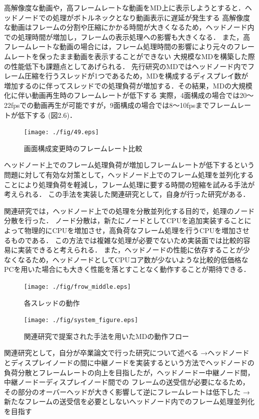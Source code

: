 高解像度な動画や，高フレームレートな動画をMD上に表示しようとすると．ヘッドノードでの処理がボトルネックとなり動画表示に遅延が発生する
高解像度な動画はフレームの分割や圧縮にかかる時間が大きくなるため，ヘッドノード内での処理時間が増加し，フレームの表示処理への影響も大きくなる．
また，高フレームレートな動画の場合には，フレーム処理時間の影響により元々のフレームレートを保ったまま動画を表示することができない
大規模なMDを構築した際の性能低下も課題点としてあげられる．
先行研究のMDではヘッドノード内でフレーム圧縮を行うスレッドが1つであるため，MDを構成するディスプレイ数が増加するのに伴ってスレッドでの処理負荷が増加する．その結果，MDの大規模化に伴い動画再生時のフレームレートが低下する
実際，4面構成の場合では20〜22fpsでの動画再生が可能ですが，9面構成の場合では8〜10fpsまでフレームレートが低下する (図2.6)．

\begin{figure}[H]
  \hspace*{\fill}
  \texttt{[image: ./fig/49.eps]}
  \hspace*{\fill}
  \label{fig_2.6}
  \caption{画面構成変更時のフレームレート比較}
 \end{figure}

ヘッドノード上でのフレーム処理負荷が増加しフレームレートが低下するという問題に対して有効な対策として，ヘッドノード上でのフレーム処理を並列化することにより処理負荷を軽減し，フレーム処理に要する時間の短縮を試みる手法が考えられる．
この手法を実装した関連研究として，自身が行った研究がある．

関連研究では，ヘッドノード上での処理を分散並列化する目的で，処理のノード分散を行った．
ノード分散は，新たにノードとしてCPUを追加実装することによって物理的にCPUを増加させ，高負荷なフレーム処理を行うCPUを増加させるものである．
この方法では複雑な処理が必要でないため実装面では比較的容易に実装できると考えられる．
また，ヘッドノードの性能に依存することが少なくなるため，ヘッドノードとしてCPUコア数が少ないような比較的低価格なPCを用いた場合にも大きく性能を落とすことなく動作することが期待できる．


\begin{figure}[H]
  \hspace*{\fill}
  \texttt{[image: ./fig/frow\_middle.eps]}
  \hspace*{\fill}
  \caption{各スレッドの動作}
\end{figure}

\begin{figure}[H]
  \hspace*{\fill}
  \texttt{[image: ./fig/system\_figure.eps]}
  \hspace*{\fill}
  \caption{関連研究で提案された手法を用いたMDの動作フロー}
 \end{figure}

関連研究として，自分が卒業論文で行った研究について述べる
→ヘッドノードとディスプレイノードの間に中継ノードを実装するという方法でヘッドノードの負荷分散とフレームレートの向上を目指したが，ヘッドノードー中継ノード間，中継ノードーディスプレイノード間での
フレームの送受信が必要になるため，その部分のオーバーヘッドが大きく影響して逆にフレームレートは低下した
→新たなフレームの送受信を必要としないヘッドノード内でのフレーム処理並列化を目指す
